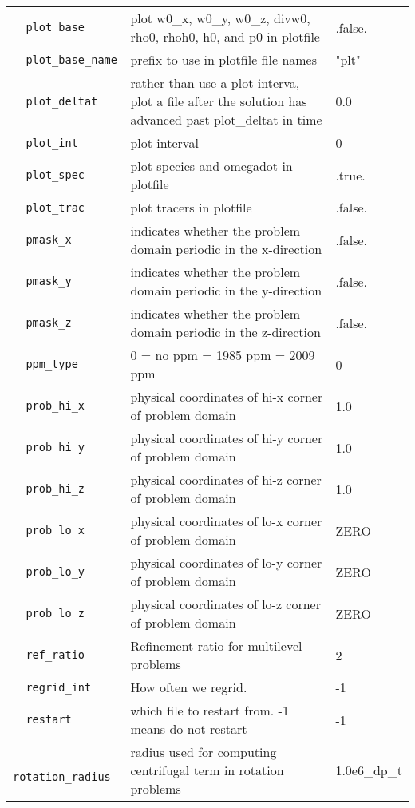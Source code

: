 {\begin{center}
\begin{longtable}{|l|p{3.25in}|l|}
\verb=  plot_base  = &   plot w0\_x, w0\_y, w0\_z, divw0, rho0, rhoh0, h0, and p0 in plotfile  &  .false. \\
\verb=  plot_base_name  = &   prefix to use in plotfile file names  &  "plt" \\
\verb=  plot_deltat  = &   rather than use a plot interva, plot a file after the solution has advanced past plot\_deltat in time  &  0.0 \\
\verb=  plot_int  = &   plot interval  &  0 \\
\verb=  plot_spec  = &   plot species and omegadot in plotfile  &  .true. \\
\verb=  plot_trac  = &   plot tracers in plotfile  &  .false. \\
\verb=  pmask_x  = &   indicates whether the problem domain periodic in the x-direction  &  .false. \\
\verb=  pmask_y  = &   indicates whether the problem domain periodic in the y-direction  &  .false. \\
\verb=  pmask_z  = &   indicates whether the problem domain periodic in the z-direction  &  .false. \\
\verb=  ppm_type  = &   0 = no ppm \newline 1 = 1985 ppm \newline 2 = 2009 ppm  &  0 \\
\verb=  prob_hi_x  = &   physical coordinates of hi-x corner of problem domain  &  1.0 \\
\verb=  prob_hi_y  = &   physical coordinates of hi-y corner of problem domain  &  1.0 \\
\verb=  prob_hi_z  = &   physical coordinates of hi-z corner of problem domain  &  1.0 \\
\verb=  prob_lo_x  = &   physical coordinates of lo-x corner of problem domain  &  ZERO \\
\verb=  prob_lo_y  = &   physical coordinates of lo-y corner of problem domain  &  ZERO \\
\verb=  prob_lo_z  = &   physical coordinates of lo-z corner of problem domain  &  ZERO \\
\verb=  ref_ratio  = &   Refinement ratio for multilevel problems  &  2 \\
\verb=  regrid_int  = &   How often we regrid.  &  -1 \\
\verb=  restart  = &   which file to restart from.  -1 means do not restart  &  -1 \\
\verb=  rotation_radius  = &   radius used for computing centrifugal term in rotation problems  &  1.0e6\_dp\_t \\

\end{longtable}
\end{center}}
